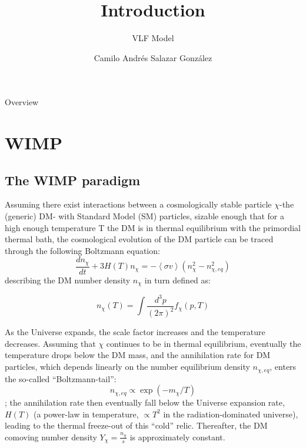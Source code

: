 \documentclass[compress,xcolor=table]{beamer}
\title{Introduction}
\subtitle{VLF Model} %
\date{\formatdate{22}{03}{2020}}
\author{Camilo Andrés Salazar González}
\institute{Physics Institute} %
\begin{document}
\begin{frame}[plain]
	\titlepage
	\setcounter{framenumber}{0}
\end{frame}

\begin{frame}[allowframebreaks]{Overview}
\tableofcontents
\end{frame}

\section{WIMP} 


\subsection{The WIMP paradigm}

\begin{frame}{}
Assuming there exist interactions between a cosmologically stable particle $\chi$-the (generic) DM- with Standard Model (SM) particles, sizable enough that for a high enough temperature T the DM is in thermal equilibrium with the primordial thermal bath, the cosmological evolution of the DM particle can be traced through the following Boltzmann equation:
\[
\frac{dn_{\chi}}{dt}+3H(T)n_{\chi}=-\left\langle \sigma v \right\rangle \left(n^2_{\chi}-n^2_{\chi,eq}\right)
\]
describing the DM number density $n_{\chi}$ in turn defined as:

\[
n_{\chi}(T)=\int\frac{d^3p}{(2\pi)^2}f_{\chi}(p,T)
\]

\end{frame}


\begin{frame}{}


As the Universe expands, the scale factor increases and the temperature decreases. Assuming that $\chi$ continues to be in thermal equilibrium, eventually the temperature drops below the DM mass, and the annihilation rate for DM particles, which depends linearly on the number equilibrium density $n_{\chi,eq}$, enters the so-called “Boltzmann-tail”: 
\[
n_{\chi,eq}\propto\exp(-m_{\chi}/T)
\]; 
the annihilation rate then eventually fall below the Universe expansion rate, $H(T)$ (a power-law in temperature, $\propto T^2$ in the radiation-dominated universe), leading to the thermal freeze-out of this “cold” relic. Thereafter, the DM comoving number density $Y_{\chi}=\frac{n_{\chi}}{s}$ is approximately constant.

\end{frame}
\end{document}
